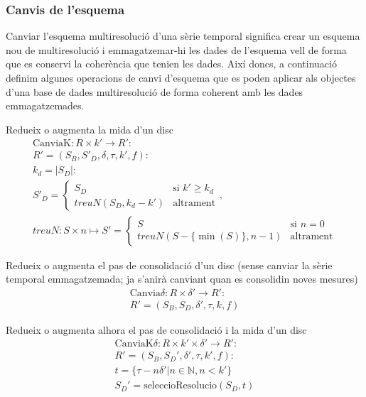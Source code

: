 \subsubsection{Canvis de l'esquema}

Canviar l'esquema multiresolució d'una sèrie temporal significa crear
un esquema nou de multiresolució i emmagatzemar-hi les dades de
l'esquema vell de forma que es conservi la coherència que tenien les
dades. Així doncs, a continuació definim algunes operacions de canvi
d'esquema que es poden aplicar als objectes d'una base de dades
multiresolució de forma coherent amb les dades emmagatzemades.


\todo{}

Redueix o augmenta la mida d'un disc
  \begin{gather*}
    \text{CanviaK}: R \times k' \longrightarrow R': \\
    R' = (S_B,S'_D,\delta,\tau,k',f) : \\
    k_d = |S_D|:\\
    S'_D = \begin{cases}
      S_D         & \text{si } k' \geq k_d   \\
      treuN(S_D,k_d-k')    & \text{altrament}
    \end{cases}, \\
    treuN: S \times n \mapsto S'=  
    \begin{cases}
      S                & \text{si } n=0   \\
      treuN(S - \{\min(S)\},n-1)  & \text{altrament}
    \end{cases}
\end{gather*}


Redueix o augmenta el pas de consolidació d'un disc (sense canviar la sèrie temporal emmagatzemada; ja s'anirà canviant quan es consolidin noves mesures)
  \begin{gather*}
    \text{Canvia}\delta: R \times \delta' \longrightarrow R': \\
    R' = (S_B,S_D,\delta',\tau,k,f)
  \end{gather*}


Redueix o augmenta alhora el pas de consolidació i la mida d'un disc
  \begin{gather*}
    \text{CanviaK}\delta: R \times k' \times \delta' \longrightarrow R': \\
    R' = (S_B,S_D',\delta',\tau,k',f): \\    
    t = \{ \tau-n\delta' | n\in\mathbb{N},n<k' \} \\
    S_D' = \text{seleccioResolucio}(S_D,t)
  \end{gather*}




